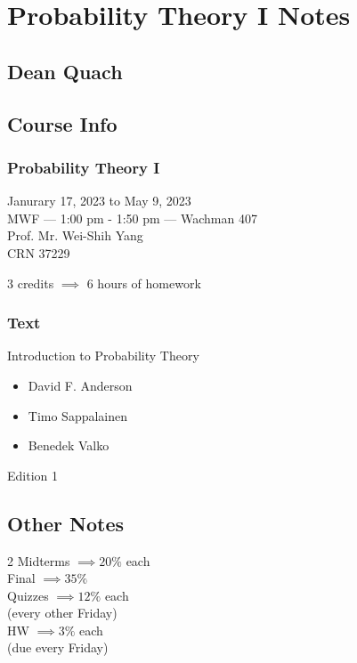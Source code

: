 \documentclass[12pt]{book}
\begin{document}
\frontmatter
%
\chapter*{\Huge \center Probability Theory I Notes}
\thispagestyle{empty}
\section*{\huge \center Dean Quach}



\newpage
\section*{\center \normalsize Course Info}
\subsection*{\center \normalsize Probability Theory I}

\begin{center}
Janurary 17, 2023 to May 9, 2023\\
MWF --- 1:00 pm - 1:50 pm --- Wachman 407\\
Prof. Mr. Wei-Shih Yang\\
CRN 37229

3 credits $\implies{}$ 6 hours of homework
\end{center}

\subsection*{\center \normalsize Text}
\begin{center}
Introduction to Probability Theory
\begin{itemize}
\item David F. Anderson
\item Timo Sappalainen
\item Benedek Valko
\end{itemize}
Edition 1
\end{center}


\newpage
\section*{\center \normalsize Other Notes}
\begin{center}
2 Midterms $\implies 20\%$ each\\
Final $\implies 35\%$\\

Quizzes $\implies 12\%$ each\\
(every other Friday)\\

HW $\implies 3\%$ each\\
(due every Friday)\\
\end{center}
\end{document}
